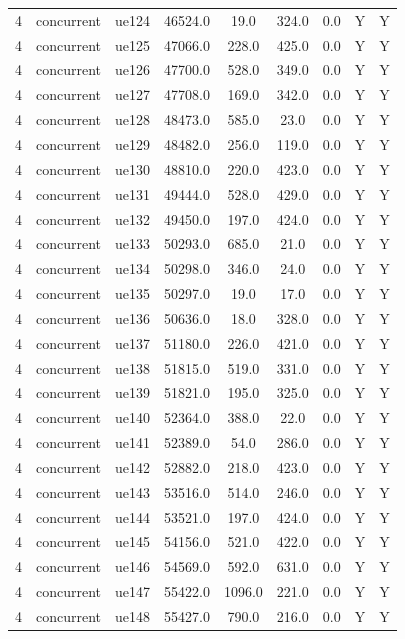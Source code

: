 \begin{table}[ht]
\begin{tabular}{|c|c|c|c|c|c|c|c|c|}
4 & concurrent & ue124 & 46524.0 & 19.0 & 324.0 & 0.0 & Y & Y \\
4 & concurrent & ue125 & 47066.0 & 228.0 & 425.0 & 0.0 & Y & Y \\
4 & concurrent & ue126 & 47700.0 & 528.0 & 349.0 & 0.0 & Y & Y \\
4 & concurrent & ue127 & 47708.0 & 169.0 & 342.0 & 0.0 & Y & Y \\
4 & concurrent & ue128 & 48473.0 & 585.0 & 23.0 & 0.0 & Y & Y \\
4 & concurrent & ue129 & 48482.0 & 256.0 & 119.0 & 0.0 & Y & Y \\
4 & concurrent & ue130 & 48810.0 & 220.0 & 423.0 & 0.0 & Y & Y \\
4 & concurrent & ue131 & 49444.0 & 528.0 & 429.0 & 0.0 & Y & Y \\
4 & concurrent & ue132 & 49450.0 & 197.0 & 424.0 & 0.0 & Y & Y \\
4 & concurrent & ue133 & 50293.0 & 685.0 & 21.0 & 0.0 & Y & Y \\
4 & concurrent & ue134 & 50298.0 & 346.0 & 24.0 & 0.0 & Y & Y \\
4 & concurrent & ue135 & 50297.0 & 19.0 & 17.0 & 0.0 & Y & Y \\
4 & concurrent & ue136 & 50636.0 & 18.0 & 328.0 & 0.0 & Y & Y \\
4 & concurrent & ue137 & 51180.0 & 226.0 & 421.0 & 0.0 & Y & Y \\
4 & concurrent & ue138 & 51815.0 & 519.0 & 331.0 & 0.0 & Y & Y \\
4 & concurrent & ue139 & 51821.0 & 195.0 & 325.0 & 0.0 & Y & Y \\
4 & concurrent & ue140 & 52364.0 & 388.0 & 22.0 & 0.0 & Y & Y \\
4 & concurrent & ue141 & 52389.0 & 54.0 & 286.0 & 0.0 & Y & Y \\
4 & concurrent & ue142 & 52882.0 & 218.0 & 423.0 & 0.0 & Y & Y \\
4 & concurrent & ue143 & 53516.0 & 514.0 & 246.0 & 0.0 & Y & Y \\
4 & concurrent & ue144 & 53521.0 & 197.0 & 424.0 & 0.0 & Y & Y \\
4 & concurrent & ue145 & 54156.0 & 521.0 & 422.0 & 0.0 & Y & Y \\
4 & concurrent & ue146 & 54569.0 & 592.0 & 631.0 & 0.0 & Y & Y \\
4 & concurrent & ue147 & 55422.0 & 1096.0 & 221.0 & 0.0 & Y & Y \\
4 & concurrent & ue148 & 55427.0 & 790.0 & 216.0 & 0.0 & Y & Y \\

\end{tabular}
\end{table}
